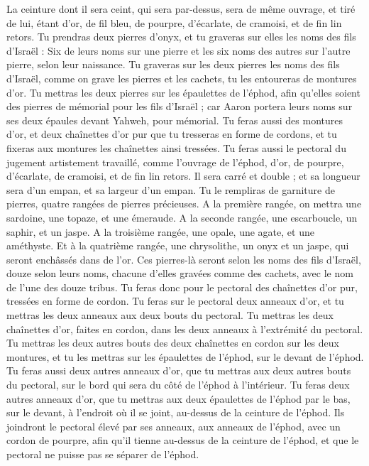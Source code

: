\begin{multicols}{2}
La ceinture dont il sera ceint, qui sera par-dessus, sera de même ouvrage, et tiré de lui, étant d'or, de fil bleu, de pourpre, d'écarlate, de cramoisi, et de fin lin retors.
Tu prendras deux pierres d'onyx, et tu graveras sur elles les noms des fils d'Israël :
Six de leurs noms sur une pierre et les six noms des autres sur l'autre pierre, selon leur naissance.
Tu graveras sur les deux pierres les noms des fils d’Israël, comme on grave les pierres et les cachets, tu les entoureras de montures d’or.
Tu mettras les deux pierres sur les épaulettes de l'éphod, afin qu'elles soient des pierres de mémorial pour les fils d'Israël ; car Aaron portera leurs noms sur ses deux épaules devant Yahweh, pour mémorial.
Tu feras aussi des montures d'or,
et deux chaînettes d’or pur que tu tresseras en forme de cordons, et tu fixeras aux montures les chaînettes ainsi tressées.
Tu feras aussi le pectoral du jugement artistement travaillé, comme l'ouvrage de l'éphod, d'or, de pourpre, d'écarlate, de cramoisi, et de fin lin retors.
Il sera carré et double ; et sa longueur sera d’un empan, et sa largeur d'un empan.
Tu le rempliras de garniture de pierres, quatre rangées de pierres précieuses. A la première rangée, on mettra une sardoine, une topaze, et une émeraude.
A la seconde rangée, une escarboucle, un saphir, et un jaspe.
A la troisième rangée, une opale, une agate, et une améthyste.
Et à la quatrième rangée, une chrysolithe, un onyx et un jaspe, qui seront enchâssés dans de l'or.
Ces pierres-là seront selon les noms des fils d'Israël, douze selon leurs noms, chacune d'elles gravées comme des cachets, avec le nom de l’une des douze tribus.
Tu feras donc pour le pectoral des chaînettes d’or pur, tressées en forme de cordon.
Tu feras sur le pectoral deux anneaux d'or, et tu mettras les deux anneaux aux deux bouts du pectoral.
Tu mettras les deux chaînettes d'or, faites en cordon, dans les deux anneaux à l'extrémité du pectoral.
Tu mettras les deux autres bouts des deux chaînettes en cordon sur les deux montures, et tu les mettras sur les épaulettes de l'éphod, sur le devant de l'éphod.
Tu feras aussi deux autres anneaux d'or, que tu mettras aux deux autres bouts du pectoral, sur le bord qui sera du côté de l'éphod à l’intérieur.
Tu feras deux autres anneaux d'or, que tu mettras aux deux épaulettes de l'éphod par le bas, sur le devant, à l'endroit où il se joint, au-dessus de la ceinture de l'éphod.
Ils joindront le pectoral élevé par ses anneaux, aux anneaux de l'éphod, avec un cordon de pourpre, afin qu'il tienne au-dessus de la ceinture de l'éphod, et que le pectoral ne puisse pas se séparer de l'éphod.

\end{multicols}
